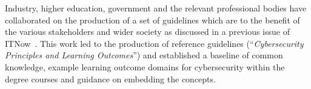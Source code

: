 \documentclass[a4paper,11pt]{article}
\begin{document}

Industry, higher education, government and the relevant professional bodies have collaborated on the production of a set of guidelines which are to the benefit of the various stakeholders and wider society as discussed in a previous issue of ITNow~\cite{Irons2016}. This work led to the production of reference guidelines (``{\emph{Cybersecurity Principles and Learning Outcomes}}'')  and established a baseline of common knowledge, example learning outcome domains for cybersecurity within the degree courses and guidance on embedding the concepts. 
\end{document}
